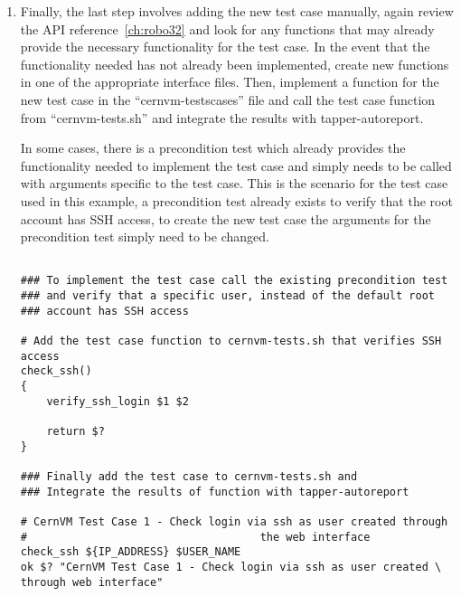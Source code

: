 \begin{enumerate}
\item	Finally, the last step involves adding the new test case manually, again review the API reference~\ref{ch:robo32}
			and look for any functions that may already provide the necessary functionality for the test case. In the event that
			the functionality needed has not already been implemented, create new functions in one of the appropriate interface
			files. Then, implement a function for the new test case in the ``cernvm-testscases'' file and call the test case function
			from ``cernvm-tests.sh'' and integrate the results with tapper-autoreport.
						
			In some cases, there is a precondition test which already provides the functionality needed to implement the test case
			and simply needs to be called with arguments specific to the test case. This is the scenario for the test case used
			in this example, a precondition test already exists to verify that the root account has SSH access, to  create the new
			test case the arguments for the precondition test simply need to be changed.

\lstset{language=bash,caption=Adding a New Test Case and Integrating with Tapper-AutoReport}
\begin{lstlisting}

### To implement the test case call the existing precondition test 
### and verify that a specific user, instead of the default root
### account has SSH access
			 
# Add the test case function to cernvm-tests.sh that verifies SSH access
check_ssh()
{
    verify_ssh_login $1 $2

    return $?
}

### Finally add the test case to cernvm-tests.sh and 
### Integrate the results of function with tapper-autoreport

# CernVM Test Case 1 - Check login via ssh as user created through
#                                    the web interface
check_ssh ${IP_ADDRESS} $USER_NAME
ok $? "CernVM Test Case 1 - Check login via ssh as user created \
through web interface"
\end{lstlisting}
			

\end{enumerate}

